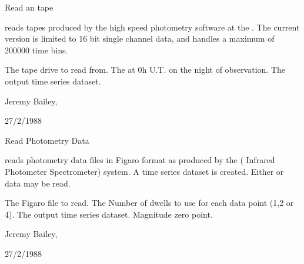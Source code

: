 \begin{manroutinedescription}
        Read an {} tape

        {} reads tapes produced by the {} high speed %
photometry
        software at the {}. The current version is limited to 16 bit
        single channel data, and handles a maximum of 200000 time bins.

\begin{manparametertable}
   The tape drive to read from.
   The {} at 0h U.T. %
on the night of observation.
  The %
output time series dataset.

\end{manparametertable}
        Jeremy Bailey, {}

        27/2/1988

\end{manroutinedescription}
\begin{manroutinedescription}
        Read {} Photometry Data

        {} reads photometry data files in Figaro format as produced
        by the {} ({} Infrared Photometer Spectrometer) %
{} system.
        A time series dataset is created. Either {} or {} %
data may be
        read.

\begin{manparametertable}
     The {} Figaro %
file to read.
  The Number of {} %
dwells to use for each
                               data point (1,2 or 4).
  The %
output time series dataset.
     Magnitude zero point.

\end{manparametertable}
          Jeremy Bailey, {}

          27/2/1988

\end{manroutinedescription}
